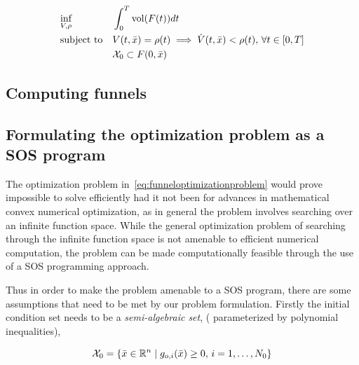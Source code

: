 \begin{align}
  \label{eq:funneloptimizationproblem}
  &\underset{V,\rho}{\text{inf}} \; &&\int_{0}^{T} \operatorname{vol}(F(t)) dt \\
  &\text{subject to} && V(t,\bar{x}) = \rho (t) \implies \dot{V}(t,\bar{x}) < \rho (t), \, \forall t \in [0,T] \\
  && &\mathcal{X}_0 \subset F(0,\bar{x}) \\
\end{align} 


\subsection{Computing funnels}

\subsection{Formulating the optimization problem as a SOS program}

The optimization problem in~\ref{eq:funneloptimizationproblem} would prove
impossible to solve efficiently had it not been for advances in mathematical
convex numerical optimization, as in general the problem involves searching over
an infinite function space. While the general optimization problem of searching
through the infinite function space is not amenable to efficient numerical
computation, the problem can be made computationally feasible through the use of
a \ac{SOS} programming approach.

Thus in order to make the problem amenable to a \ac{SOS} program, there are some
assumptions that need to be met by our problem formulation. Firstly the initial
condition set needs to be a \textit{semi-algebraic set}, (\ie{} parameterized by
polynomial inequalities),

\begin{equation}
  \mathcal{X}_0 = \lbrace\bar{x} \in \mathbb{R}^n \mid g_{o,i}(\bar{x}) \geq 0, \, i = 1,\ldots,N_0\rbrace
\end{equation}

